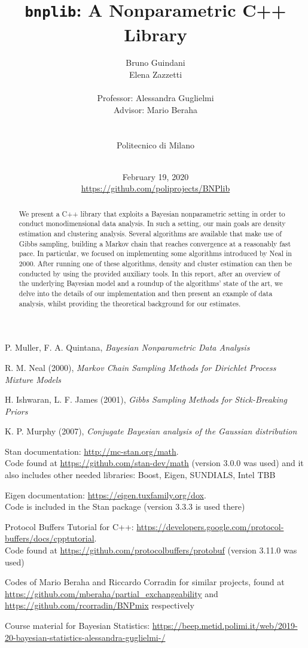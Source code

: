 \documentclass[a4paper]{report}
\title{\texttt{bnplib}: A Nonparametric C++ Library}
\author{
Bruno Guindani \\
Elena Zazzetti \\
\\
Professor: Alessandra Guglielmi \\
Advisor: Mario Beraha \\
\\
\\
Politecnico di Milano \\
\\
}
\date{
February 19, 2020
\\[250pt]
{\color{gray} {\url{https://github.com/poliprojects/BNPlib}}}}
\begin{document}
\maketitle

\begin{abstract}
We present a C++ library that exploits a Bayesian nonparametric setting in order to conduct monodimensional data analysis.
In such a setting, our main goals are density estimation and clustering analysis.
Several algorithms are available that make use of Gibbs sampling, building a Markov chain that reaches convergence at a reasonably fast pace.
In particular, we focused on implementing some algorithms introduced by Neal in 2000.
After running one of these algorithms, density and cluster estimation can then be conducted by using the provided auxiliary tools.
In this report, after an overview of the underlying Bayesian model and a roundup of the algorithms' state of the art, we delve into the details of our implementation and then present an example of data analysis, whilst providing the theoretical background for our estimates.
\end{abstract}
\clearpage

\tableofcontents




\begin{thebibliography}{9}
	 P. Muller, F. A. Quintana, \textit{Bayesian Nonparametric Data Analysis}
	
	 R. M. Neal (2000), \textit{Markov Chain Sampling Methods for Dirichlet Process Mixture Models}
	
	 H. Ishwaran, L. F. James (2001), \textit{Gibbs Sampling Methods for Stick-Breaking Priors}
	
	 K. P. Murphy (2007), \textit{Conjugate Bayesian analysis of the Gaussian distribution}
	
	 Stan documentation: \url{http://mc-stan.org/math}. \\
	Code found at \url{https://github.com/stan-dev/math} (version 3.0.0 was used) and it also includes other needed libraries: Boost, Eigen, SUNDIALS, Intel TBB
	
	 Eigen documentation: \url{https://eigen.tuxfamily.org/dox}. \\
	Code is included in the Stan package (version 3.3.3 is used there)
	
	 Protocol Buffers Tutorial for C++: \url{https://developers.google.com/protocol-buffers/docs/cpptutorial}. \\
	Code found at \url{https://github.com/protocolbuffers/protobuf} (version 3.11.0 was used)
	
	 Codes of Mario Beraha and Riccardo Corradin for similar projects, found at \url{https://github.com/mberaha/partial_exchangeability} and \url{https://github.com/rcorradin/BNPmix} respectively
	
	 Course material for Bayesian Statistics: \url{https://beep.metid.polimi.it/web/2019-20-bayesian-statistics-alessandra-guglielmi-/}
\end{thebibliography}
\end{document}
